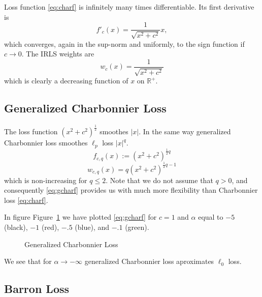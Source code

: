 \documentclass[
  12pt,
  letterpaper,
  DIV=11,
  numbers=noendperiod]{scrartcl}
\theoremstyle{plain}
\theoremstyle{remark}
\begin{document}
Loss function \eqref{eq:charf} is infinitely many times differentiable.
Its first derivative is \begin{equation}
f'_c(x)=\frac{1}{\sqrt{x^2+c^2}}x,\label{eq:charg}
\end{equation} which converges, again in the sup-norm and uniformly, to
the sign function if \(c\rightarrow 0\). The IRLS weights are
\begin{equation}
w_c(x)=\frac{1}{\sqrt{x^2+c^2}}\label{eq:charw}
\end{equation} which is clearly a decreasing function of \(x\) on
\(\mathbb{R}^+\).

\subsection{Generalized Charbonnier
Loss}\label{generalized-charbonnier-loss}

The loss function \((x^2+c^2)^\frac12\) smoothes \(|x|\). In the same
way generalized Charbonnier loss smoothes \(\ell_p\) loss \(|x|^q\).
\begin{equation}
f_{c,q}(x):=(x^2+c^2)^{\frac12 q}\label{eq:gcharf}
\end{equation} \begin{equation}
w_{c,q}(x)=q(x^2+c^2)^{\frac12 q-1}\label{eq:gcharw}
\end{equation} which is non-increasing for \(q\leq 2\). Note that we do
not assume that \(q>0\), and consequently \eqref{eq:gcharf} provides us
with much more flexibility than Charbonnier loss \eqref{eq:charf}.

In figure Figure~\ref{fig-gcharfig} we have plotted \eqref{eq:gcharf}
for \(c=1\) and \(\alpha\) equal to \(-5\) (black), \(-1\) (red),
\(-.5\) (blue), and \(-.1\) (green).

\begin{figure}


\caption{\label{fig-gcharfig}Generalized Charbonnier Loss}

\end{figure}%

We see that for \(\alpha\rightarrow-\infty\) generalized Charbonnier
loss aproximates \(\ell_0\) loss.

\subsection{Barron Loss}\label{barron-loss}
\end{document}
